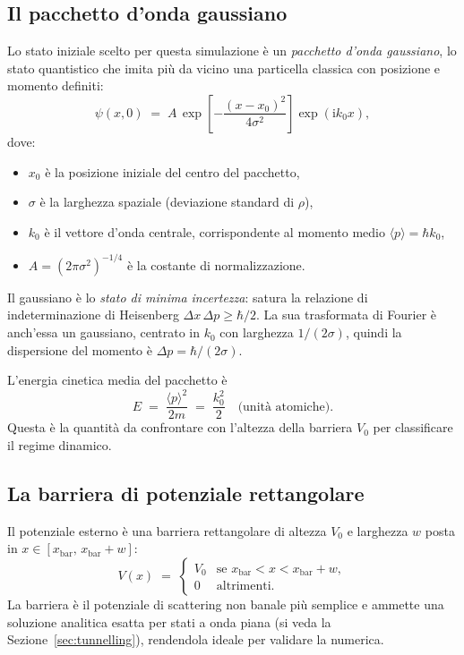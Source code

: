 \documentclass[12pt, a4paper]{article}
\newcommand{\ii}{\mathrm{i}}          %
\begin{document}
\subsection{Il pacchetto d'onda gaussiano}

Lo stato iniziale scelto per questa simulazione è un \emph{pacchetto
d'onda gaussiano}, lo stato quantistico che imita più da vicino una
particella classica con posizione e momento definiti:
\begin{equation}
  \psi(x,0) \;=\; A\,\exp\!\left[-\frac{(x-x_0)^2}{4\sigma^2}\right]
  \exp\!\left(\ii k_0 x\right),
  \label{eq:gauss}
\end{equation}
dove:
\begin{itemize}
  \item $x_0$ è la posizione iniziale del centro del pacchetto,
  \item $\sigma$ è la larghezza spaziale (deviazione standard di $\rho$),
  \item $k_0$ è il vettore d'onda centrale, corrispondente al momento
        medio $\langle p\rangle = \hbar k_0$,
  \item $A = (2\pi\sigma^2)^{-1/4}$ è la costante di normalizzazione.
\end{itemize}

Il gaussiano è lo \emph{stato di minima incertezza}: satura la
relazione di indeterminazione di Heisenberg
$\Delta x\,\Delta p \geq \hbar/2$.  La sua trasformata di Fourier
è anch'essa un gaussiano, centrato in $k_0$ con larghezza $1/(2\sigma)$,
quindi la dispersione del momento è $\Delta p = \hbar/(2\sigma)$.

L'energia cinetica media del pacchetto è
\begin{equation}
  E \;=\; \frac{\langle p\rangle^2}{2m} \;=\; \frac{k_0^2}{2}
  \quad \text{(unità atomiche)}.
  \label{eq:energy}
\end{equation}
Questa è la quantità da confrontare con l'altezza della barriera $V_0$
per classificare il regime dinamico.

\subsection{La barriera di potenziale rettangolare}

Il potenziale esterno è una barriera rettangolare di altezza $V_0$ e
larghezza $w$ posta in $x \in [x_\text{bar},\, x_\text{bar}+w]$:
\begin{equation}
  V(x) \;=\;
  \begin{cases}
    V_0 & \text{se } x_\text{bar} < x < x_\text{bar} + w, \\
    0   & \text{altrimenti.}
  \end{cases}
  \label{eq:barrier}
\end{equation}
La barriera è il potenziale di scattering non banale più semplice e
ammette una soluzione analitica esatta per stati a onda piana (si veda
la Sezione~\ref{sec:tunnelling}), rendendola ideale per validare la
numerica.
\end{document}
